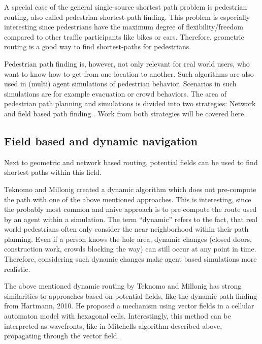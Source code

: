 	A special case of the general single-source shortest path problem is pedestrian routing, also called pedestrian shortest-path finding.
	This problem is especially interesting since pedestrians have the maximum degree of flexibility/freedom compared to other traffic participants like bikes or cars.
	Therefore, geometric routing is a good way to find shortest-paths for pedestrians.
	
	Pedestrian path finding is, however, not only relevant for real world users, who want to know how to get from one location to another.
	Such algorithms are also used in (multi) agent simulations of pedestrian behavior.
	Scenarios in such simulations are for example evacuation or crowd behaviors.
	The area of pedestrian path planning and simulations is divided into two strategies: Network and field based path finding \cite[2]{hartmann-geodesic}.
	Work from both strategies will be covered here.
	
	\subsection{Field based and dynamic navigation}
	
		Next to geometric and network based routing, potential fields can be used to find shortest paths within this field.
		
		Teknomo and Millonig created a dynamic algorithm which does not pre-compute the path with one of the above mentioned approaches\cite{teknomo-millonig-routing}.
		This is interesting, since the probably most common and naive approach is to pre-compute the route used by an agent within a simulation.
		The term \enquote{dynamic} refers to the fact, that real world pedestrians often only consider the near neighborhood within their path planning.
		Even if a person knows the hole area, dynamic changes (closed doors, construction work, crowds blocking the way) can still occur at any point in time.
		Therefore, considering such dynamic changes make agent based simulations more realistic.
		
		The above mentioned dynamic routing by Teknomo and Millonig has strong similarities to approaches based on potential fields, like the dynamic path finding from Hartmann, 2010\cite{hartmann-geodesic}.
		He proposed a mechanism using vector fields in a cellular automaton model with hexagonal cells.
		Interestingly, this method can be interpreted as wavefronts, like in Mitchells algorithm described above, propagating through the vector field\cite[4]{hartmann-geodesic}.
			
